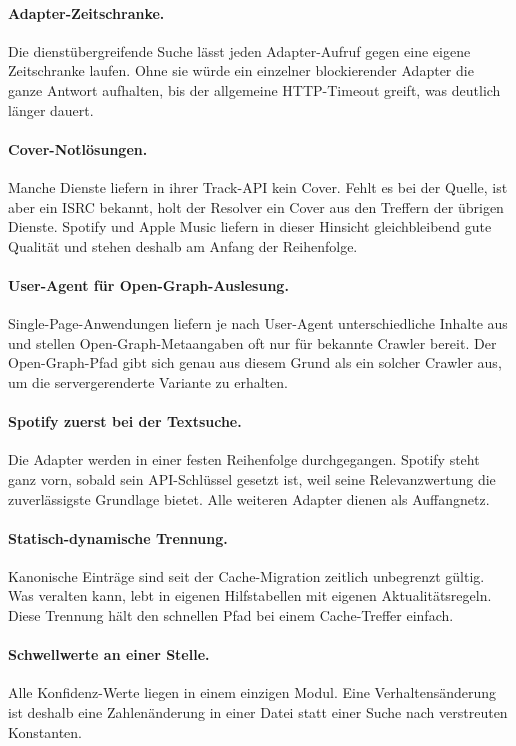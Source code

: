 \documentclass[11pt,a4paper]{article}
\begin{document}
\paragraph{Adapter-Zeitschranke.} Die dienstübergreifende Suche
lässt jeden Adapter-Aufruf gegen eine eigene Zeitschranke laufen.
Ohne sie würde ein einzelner blockierender Adapter die ganze
Antwort aufhalten, bis der allgemeine HTTP-Timeout greift, was
deutlich länger dauert.

\paragraph{Cover-Notlösungen.} Manche Dienste liefern in ihrer
Track-API kein Cover. Fehlt es bei der Quelle, ist aber ein ISRC
bekannt, holt der Resolver ein Cover aus den Treffern der
übrigen Dienste. Spotify und Apple Music liefern in dieser Hinsicht
gleichbleibend gute Qualität und stehen deshalb am Anfang der
Reihenfolge.

\paragraph{User-Agent für Open-Graph-Auslesung.}
Single-Page-Anwendungen liefern je nach User-Agent
unterschiedliche Inhalte aus und stellen Open-Graph-Metaangaben
oft nur für bekannte Crawler bereit. Der Open-Graph-Pfad gibt
sich genau aus diesem Grund als ein solcher Crawler aus, um die
servergerenderte Variante zu erhalten.

\paragraph{Spotify zuerst bei der Textsuche.} Die Adapter werden
in einer festen Reihenfolge durchgegangen. Spotify steht ganz
vorn, sobald sein API-Schlüssel gesetzt ist, weil seine
Relevanzwertung die zuverlässigste Grundlage bietet. Alle
weiteren Adapter dienen als Auffangnetz.

\paragraph{Statisch-dynamische Trennung.} Kanonische Einträge
sind seit der Cache-Migration zeitlich unbegrenzt gültig. Was
veralten kann, lebt in eigenen Hilfstabellen mit eigenen
Aktualitätsregeln. Diese Trennung hält den schnellen Pfad bei
einem Cache-Treffer einfach.

\paragraph{Schwellwerte an einer Stelle.} Alle Konfidenz-Werte
liegen in einem einzigen Modul. Eine Verhaltensänderung ist
deshalb eine Zahlenänderung in einer Datei statt einer Suche nach
verstreuten Konstanten.

\clearpage
\theendnotes
\end{document}
